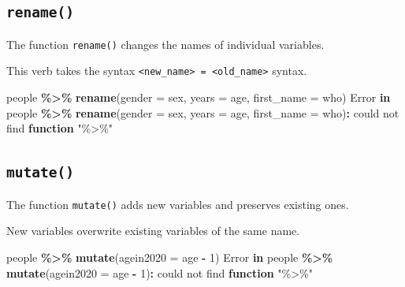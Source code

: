 \documentclass[
]{book}
\newenvironment{Shaded}{\begin{snugshade}}{\end{snugshade}}
\newcommand{\AttributeTok}[1]{\textcolor[rgb]{0.13,0.29,0.53}{#1}}
\newcommand{\ControlFlowTok}[1]{\textcolor[rgb]{0.13,0.29,0.53}{\textbf{#1}}}
\newcommand{\DecValTok}[1]{\textcolor[rgb]{0.00,0.00,0.81}{#1}}
\newcommand{\FunctionTok}[1]{\textcolor[rgb]{0.13,0.29,0.53}{\textbf{#1}}}
\newcommand{\NormalTok}[1]{#1}
\newcommand{\SpecialCharTok}[1]{\textcolor[rgb]{0.81,0.36,0.00}{\textbf{#1}}}
\newcommand{\StringTok}[1]{\textcolor[rgb]{0.31,0.60,0.02}{#1}}
\begin{document}
\subsection*{\texorpdfstring{\texttt{rename()}}{rename()}}\label{rename}

The function \texttt{rename()} changes the names of individual variables.

This verb takes the syntax \texttt{\textless{}new\_name\textgreater{}\ =\ \textless{}old\_name\textgreater{}} syntax.

\begin{Shaded}
\begin{Highlighting}[]
\NormalTok{people }\SpecialCharTok{\%\textgreater{}\%} \FunctionTok{rename}\NormalTok{(}\AttributeTok{gender =}\NormalTok{ sex, }\AttributeTok{years =}\NormalTok{ age, }\AttributeTok{first\_name =}\NormalTok{ who)}
\NormalTok{Error }\ControlFlowTok{in}\NormalTok{ people }\SpecialCharTok{\%\textgreater{}\%} \FunctionTok{rename}\NormalTok{(}\AttributeTok{gender =}\NormalTok{ sex, }\AttributeTok{years =}\NormalTok{ age, }\AttributeTok{first\_name =}\NormalTok{ who)}\SpecialCharTok{:}\NormalTok{ could not find }\ControlFlowTok{function} \StringTok{"\%\textgreater{}\%"}
\end{Highlighting}
\end{Shaded}

\subsection*{\texorpdfstring{\texttt{mutate()}}{mutate()}}\label{mutate}

The function \texttt{mutate()} adds new variables and preserves existing ones.

New variables overwrite existing variables of the same name.

\begin{Shaded}
\begin{Highlighting}[]
\NormalTok{people }\SpecialCharTok{\%\textgreater{}\%} \FunctionTok{mutate}\NormalTok{(}\AttributeTok{agein2020 =}\NormalTok{ age }\SpecialCharTok{{-}} \DecValTok{1}\NormalTok{)}
\NormalTok{Error }\ControlFlowTok{in}\NormalTok{ people }\SpecialCharTok{\%\textgreater{}\%} \FunctionTok{mutate}\NormalTok{(}\AttributeTok{agein2020 =}\NormalTok{ age }\SpecialCharTok{{-}} \DecValTok{1}\NormalTok{)}\SpecialCharTok{:}\NormalTok{ could not find }\ControlFlowTok{function} \StringTok{"\%\textgreater{}\%"}
\end{Highlighting}
\end{Shaded}
\end{document}

